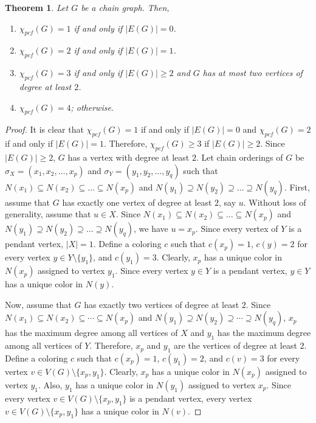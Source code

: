 \documentclass[11pt]{article}
\theoremstyle{plain}
\newtheorem{theorem}{Theorem}
\begin{document}
\begin{theorem}\label{chain_characterization_pcf}
	Let $G$ be a chain graph. Then,
	\begin{enumerate}
		\item $\chi_{pcf}(G) = 1$ if and only if $|E(G)|=0$.
		\item $\chi_{pcf}(G) = 2$ if and only if $|E(G)|=1$.
		\item $\chi_{pcf}(G) = 3$ if and only if $|E(G)|\geq 2$ and $G$ has at most two vertices of degree at least $2$.
		\item $\chi_{pcf}(G) = 4$; otherwise.
	\end{enumerate}
\end{theorem}
\begin{proof}
	It is clear that $\chi_{pcf}(G) = 1$ if and only if $|E(G)|=0$ and $\chi_{pcf}(G) = 2$ if and only if $|E(G)|=1$. Therefore, $\chi_{pcf}(G)\geq 3$ if $|E(G)| \geq 2$. 
	Since $|E(G)|\geq 2$, $G$ has a vertex with degree at least $2$. Let chain orderings of $G$ be $\sigma_X = (x_1, x_2, \ldots, x_p)$ and $\sigma_Y = (y_1, y_2, \ldots, y_q)$ such that $N(x_1) \subseteq N(x_2) \subseteq \ldots \subseteq N(x_p)$ and $N(y_1) \supseteq N(y_2) \supseteq \ldots \supseteq N(y_q)$. 
	First, assume that $G$ has exactly one vertex of degree at least $2$, say $u$. Without loss of generality, assume that $u\in X$.
	Since $N(x_1) \subseteq N(x_2) \subseteq \ldots \subseteq N(x_p)$ and $N(y_1) \supseteq N(y_2) \supseteq \ldots \supseteq N(y_q)$, we have $u=x_p$. Since every vertex of $Y$ is a pendant vertex, $|X| = 1$.
	Define a coloring $c$ such that $c(x_p) = 1$, $c(y) = 2$ for every vertex $y\in Y\setminus \{y_1\}$, and $c(y_1) = 3$. Clearly, $x_p$ has a unique color in $N(x_p)$ assigned to vertex $y_1$. Since every vertex $y\in Y$ is a pendant vertex, $y\in Y$ has a unique color in $N(y)$.
	
	\medskip
	
	Now, assume that $G$ has exactly two vertices of degree at least $2$. Since $N(x_1) \subseteq N(x_2) \subseteq \cdots \subseteq N(x_p)$ and $N(y_1) \supseteq N(y_2) \supseteq \cdots \supseteq N(y_q)$, $x_p$ has the maximum degree among all vertices of $X$ and $y_1$ has the maximum degree among all vertices of $Y$. Therefore, $x_p$ and $y_1$ are the vertices of degree at least $2$. %
	Define a coloring $c$ such that $c(x_p) = 1$, $c(y_1) = 2$, and $c(v) = 3$ for every vertex $v\in V(G)\setminus\{x_p, y_1\}$. Clearly, $x_p$ has a unique color in $N(x_p)$ assigned to vertex $y_1$. Also, $y_1$ has a unique color in $N(y_1)$ assigned to vertex $x_p$. 
	Since every vertex $v\in V(G)\setminus\{x_p, y_1\}$ is a pendant vertex, every vertex $v\in V(G)\setminus\{x_p, y_1\}$ has a unique color in $N(v)$.
	

\end{proof}
\end{document}

